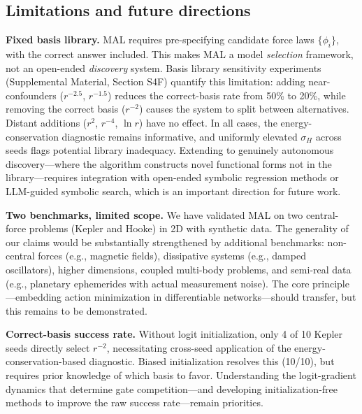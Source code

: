 \documentclass[aps,pre,reprint,superscriptaddress,longbibliography]{revtex4-2}
\begin{document}
\subsection{Limitations and future directions}
\textbf{Fixed basis library.} MAL requires pre-specifying candidate force laws $\{\phi_i\}$, with the correct answer included. This makes MAL a model \textit{selection} framework, not an open-ended \textit{discovery} system. Basis library sensitivity experiments (Supplemental Material, Section S4F) quantify this limitation: adding near-confounders ($r^{-2.5}$, $r^{-1.5}$) reduces the correct-basis rate from 50\% to 20\%, while removing the correct basis ($r^{-2}$) causes the system to split between alternatives. Distant additions ($r^2$, $r^{-4}$, $\ln r$) have no effect. In all cases, the energy-conservation diagnostic remains informative, and uniformly elevated $\sigma_H$ across seeds flags potential library inadequacy. Extending to genuinely autonomous discovery---where the algorithm constructs novel functional forms not in the library---requires integration with open-ended symbolic regression methods \cite{Udrescu2020, Cranmer2020} or LLM-guided symbolic search, which is an important direction for future work.

\textbf{Two benchmarks, limited scope.} We have validated MAL on two central-force problems (Kepler and Hooke) in 2D with synthetic data. The generality of our claims would be substantially strengthened by additional benchmarks: non-central forces (e.g., magnetic fields), dissipative systems (e.g., damped oscillators), higher dimensions, coupled multi-body problems, and semi-real data (e.g., planetary ephemerides with actual measurement noise). The core principle---embedding action minimization in differentiable networks---should transfer, but this remains to be demonstrated.

\textbf{Correct-basis success rate.} Without logit initialization, only 4 of 10 Kepler seeds directly select $r^{-2}$, necessitating cross-seed application of the energy-conservation-based diagnostic. Biased initialization resolves this (10/10), but requires prior knowledge of which basis to favor. Understanding the logit-gradient dynamics that determine gate competition---and developing initialization-free methods to improve the raw success rate---remain priorities.
\end{document}
